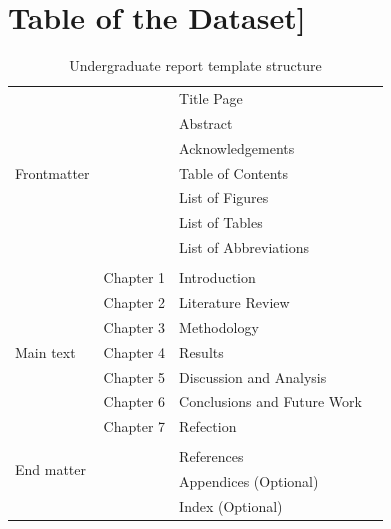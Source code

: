 \section{Table of the Dataset]}
\begin{table}[ht!]
    \centering
    \caption{Undergraduate report template structure}
    \label{tab:gen_template}
    \begin{tabular}{llll}     
        \toprule
        \multirow{7}{3cm}{Frontmatter} 
        & & Title Page & \\                  
        & & Abstract &    \\          
        & & Acknowledgements & \\                            
        & & Table of Contents &    \\                                
        & & List of Figures   &    \\                        
        & & List of Tables    &    \\                
        & & List of Abbreviations  &    \\                     
        & &   &    \\                        
        \multirow{7}{3cm}{Main text}
        & Chapter 1 & Introduction   &    \\                         
        & Chapter 2 & Literature Review   &    \\
        & Chapter 3 & Methodology   &    \\
        & Chapter 4 & Results    &    \\
        & Chapter 5 & Discussion and Analysis  &    \\
        & Chapter 6 & Conclusions and Future Work  &    \\        
        & Chapter 7 & Refection  &    \\          
        & &   &    \\                       
        \multirow{2}{3cm}{End matter}
        & & References  &    \\   
        & & Appendices (Optional)  &    \\ 
        & & Index (Optional)  &    \\ 
        \bottomrule
    \end{tabular}
\end{table}

